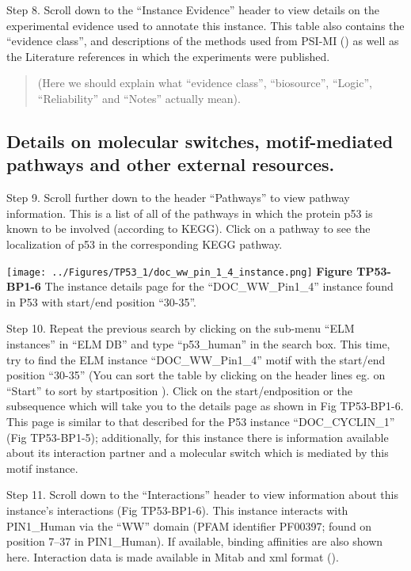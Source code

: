 Step 8. Scroll down to the ``Instance Evidence'' header to view details
on the experimental evidence used to annotate this instance. This table
also contains the ``evidence class'', and descriptions of the methods
used from PSI-MI (\cite{17925023}) as well as the Literature references
in which the experiments were published.

\begin{quote}
(Here we should explain what ``evidence class'', ``biosource'',
``Logic'', ``Reliability'' and ``Notes'' actually mean).
\end{quote}

\subsection{Details on molecular switches, motif-mediated pathways and
other external
resources.}\label{details-on-molecular-switches-motif-mediated-pathways-and-other-external-resources.}

Step 9. Scroll further down to the header ``Pathways'' to view pathway
information. This is a list of all of the pathways in which the protein
p53 is known to be involved (according to KEGG). Click on a pathway to
see the localization of p53 in the corresponding KEGG pathway.

\texttt{[image: ../Figures/TP53\_1/doc\_ww\_pin\_1\_4\_instance.png]}
\textbf{Figure TP53-BP1-6} The instance details page for the
``DOC\_WW\_Pin1\_4'' instance found in P53 with start/end position
``30-35''.

Step 10. Repeat the previous search by clicking on the sub-menu ``ELM
instances'' in ``ELM DB'' and type ``p53\_human'' in the search box.
This time, try to find the ELM instance ``DOC\_WW\_Pin1\_4'' motif with
the start/end position ``30-35'' (You can sort the table by clicking on
the header lines eg. on ``Start'' to sort by startposition ). Click on
the start/endposition or the subsequence which will take you to the
details page as shown in Fig TP53-BP1-6. This page is similar to that
described for the P53 instance ``DOC\_CYCLIN\_1'' (Fig TP53-BP1-5);
additionally, for this instance there is information available about its
interaction partner and a molecular switch which is mediated by this
motif instance.

Step 11. Scroll down to the ``Interactions'' header to view information
about this instance's interactions (Fig TP53-BP1-6). This instance
interacts with PIN1\_Human via the ``WW'' domain (PFAM identifier
PF00397; found on position 7--37 in PIN1\_Human). If available, binding
affinities are also shown here. Interaction data is made available in
Mitab and xml format (\cite{17925023}).

